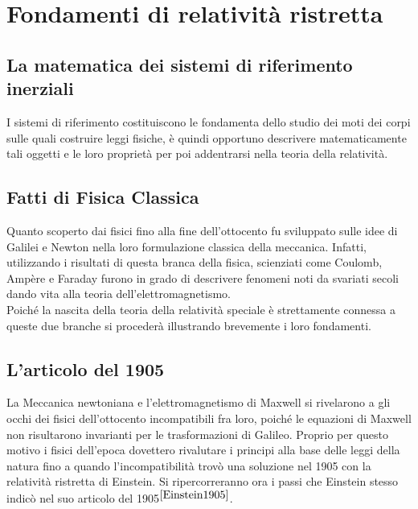 \documentclass[12pt,a4paper]{report}
\numberwithin{equation}{section}
\begin{document}
\begin{sloppypar}





\tableofcontents



\chapter{Fondamenti di relatività ristretta}

\section{La matematica dei sistemi di riferimento inerziali}
\label{sec:MathSDRI}
I sistemi di riferimento costituiscono le fondamenta dello studio dei moti dei corpi sulle quali costruire leggi fisiche, è quindi opportuno descrivere matematicamente tali oggetti e le loro proprietà per poi addentrarsi nella teoria della relatività.



\section{Fatti di Fisica Classica}
Quanto scoperto dai fisici fino alla fine dell'ottocento fu sviluppato sulle idee di Galilei e Newton nella loro formulazione classica della meccanica. Infatti, utilizzando i risultati di questa branca della fisica, scienziati come Coulomb, Ampère e Faraday furono in grado di descrivere fenomeni noti da svariati secoli dando vita alla teoria dell'elettromagnetismo.\\
Poiché la nascita della teoria della relatività speciale è strettamente connessa a queste due branche si procederà illustrando brevemente i loro fondamenti. 





\section{L'articolo del 1905}
La Meccanica newtoniana e l'elettromagnetismo di Maxwell si rivelarono a gli occhi dei fisici dell'ottocento 
incompatibili fra loro, 
poiché le equazioni di Maxwell non risultarono invarianti per le trasformazioni di Galileo. 
Proprio per questo motivo i fisici dell'epoca dovettero rivalutare i principi alla base delle leggi 
della natura fino a quando l'incompatibilità trovò una soluzione nel 1905 con la relatività ristretta di Einstein.
 Si ripercorreranno ora i passi che Einstein stesso indicò nel suo articolo del 1905$^{\cite{Einstein1905}}$.




\end{sloppypar}
\end{document}
